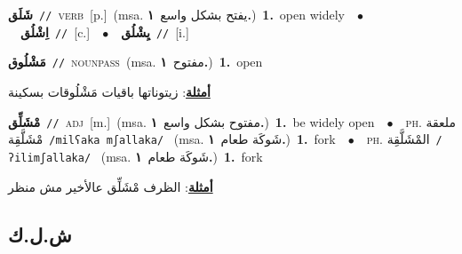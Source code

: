 \documentclass[10pt,a4paper,twoside]{article} %
\begin{document}
\begin{multicols}{2}
{\setlength\topsep{0pt}\textbf{\foreignlanguage{arabic}{شَلَق}}\ {\color{gray}\texttt{//}\color{black}}\ \textsc{verb}\ [p.]\ \color{gray}(msa. \foreignlanguage{arabic}{يفتح بشكل واسع}~\foreignlanguage{arabic}{\textbf{١.}})\color{black}\ \textbf{1.}~open widely\ \ $\bullet$\ \ \setlength\topsep{0pt}\textbf{\foreignlanguage{arabic}{اِشْلُق}}\ {\color{gray}\texttt{//}\color{black}}\ [c.]\ \ $\bullet$\ \ \setlength\topsep{0pt}\textbf{\foreignlanguage{arabic}{يِشْلُق}}\ {\color{gray}\texttt{//}\color{black}}\ [i.]\ } \vspace{2mm}

{\setlength\topsep{0pt}\textbf{\foreignlanguage{arabic}{مَشْلُوق}}\ {\color{gray}\texttt{//}\color{black}}\ \textsc{noun\textunderscore pass}\ \color{gray}(msa. \foreignlanguage{arabic}{مفتوح}~\foreignlanguage{arabic}{\textbf{١.}})\color{black}\ \textbf{1.}~open\  \begin{flushright}\color{gray}\foreignlanguage{arabic}{\textbf{\underline{\foreignlanguage{arabic}{أمثلة}}}: زيتوناتها باقيات مَشْلُوقات بسكينة}\end{flushright}\color{black}} \vspace{2mm}

{\setlength\topsep{0pt}\textbf{\foreignlanguage{arabic}{مْشَلِّق}}\ {\color{gray}\texttt{//}\color{black}}\ \textsc{adj}\ [m.]\ \color{gray}(msa. \foreignlanguage{arabic}{مفتوح بشكل واسع}~\foreignlanguage{arabic}{\textbf{١.}})\color{black}\ \textbf{1.}~be widely open\ \ $\bullet$\ \ \textsc{ph.} \color{gray} \foreignlanguage{arabic}{ملعقة مْشَلَّقِة}\color{black}\ {\color{gray}\texttt{/{\sffamily milʕaka mʃallaka}/}\color{black}}\ \color{gray} (msa. \foreignlanguage{arabic}{شَوكَة طعام}~\foreignlanguage{arabic}{\textbf{١.}})\color{black}\ \textbf{1.}~fork\ \ $\bullet$\ \ \textsc{ph.} \color{gray} \foreignlanguage{arabic}{المْشَلَّقِة}\color{black}\ {\color{gray}\texttt{/{\sffamily ʔilimʃallaka}/}\color{black}}\ \color{gray} (msa. \foreignlanguage{arabic}{شَوكَة طعام}~\foreignlanguage{arabic}{\textbf{١.}})\color{black}\ \textbf{1.}~fork\  \begin{flushright}\color{gray}\foreignlanguage{arabic}{\textbf{\underline{\foreignlanguage{arabic}{أمثلة}}}: الظرف مْشَلِّق عالأخير مش منظر}\end{flushright}\color{black}} \vspace{2mm}

\vspace{-3mm}
\subsection*{\color{blue}\foreignlanguage{arabic}{ش.ل.ك}\color{blue}{}} 


\end{multicols}
\end{document}
